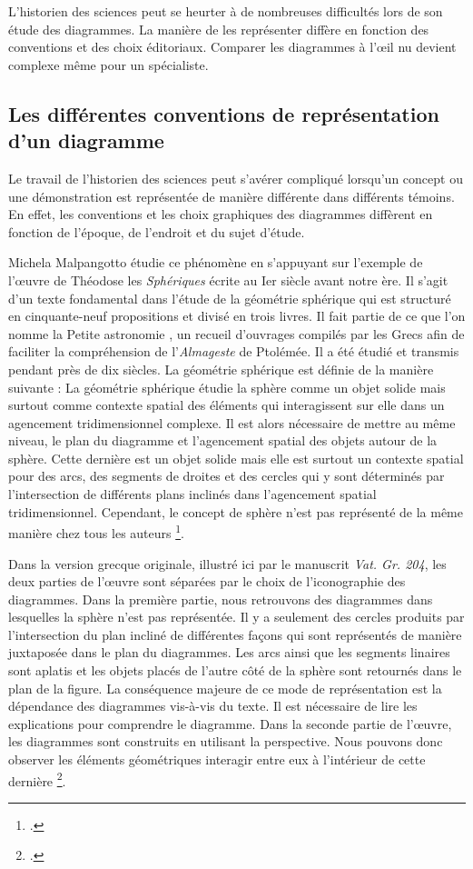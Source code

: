 L'historien des sciences peut se heurter à de nombreuses difficultés lors de son étude des diagrammes. La manière de les représenter diffère en fonction des conventions et des choix éditoriaux. Comparer les diagrammes à l'œil nu devient complexe même pour un spécialiste.

\subsection{Les différentes conventions de représentation d'un diagramme}

Le travail de l'historien des sciences peut s'avérer compliqué lorsqu'un concept ou une démonstration est représentée de manière différente dans différents témoins. En effet, les conventions et les choix graphiques des diagrammes diffèrent en fonction de l'époque, de l'endroit et du sujet d'étude.

Michela Malpangotto étudie ce phénomène en s'appuyant sur l'exemple de l'œuvre de Théodose les \textit{Sphériques} écrite au Ier siècle avant notre ère. Il s'agit d'un texte fondamental dans l'étude de la géométrie sphérique qui est structuré en cinquante-neuf propositions et divisé en trois livres. Il fait partie de ce que l'on nomme la \og Petite astronomie \fg, un recueil d'ouvrages compilés par les Grecs afin de faciliter la compréhension de l'\textit{Almageste} de Ptolémée. Il a été étudié et transmis pendant près de dix siècles. La géométrie sphérique est définie de la manière suivante : \og La géométrie sphérique étudie la sphère comme un objet solide mais surtout comme contexte spatial des éléments qui interagissent sur elle dans un agencement tridimensionnel complexe. \fg Il est alors nécessaire de mettre au même niveau, le plan du diagramme et l'agencement spatial des objets autour de la sphère. Cette dernière est un objet solide mais elle est surtout un contexte spatial pour des arcs, des segments de droites et des cercles qui y sont déterminés par l'intersection de différents plans inclinés dans l'agencement spatial tridimensionnel. Cependant, le concept de sphère n'est pas représenté de la même manière chez tous les auteurs \footcite{malpangottoGraphicalChoicesGeometrical2010}. 

Dans la version grecque originale, illustré ici par le manuscrit \textit{Vat. Gr. 204}, les deux parties de l'œuvre sont séparées par le choix de l'iconographie des diagrammes. Dans la première partie, nous retrouvons des diagrammes dans lesquelles la sphère n'est pas représentée. Il y a seulement des cercles produits par l'intersection du plan incliné de différentes façons qui sont représentés de manière juxtaposée dans le plan du diagrammes. Les arcs ainsi que les segments linaires sont aplatis et les objets placés de l'autre côté de la sphère sont retournés dans le plan de la figure. La conséquence majeure de ce mode de représentation est la dépendance des diagrammes vis-à-vis du texte. Il est nécessaire de lire les explications pour comprendre le diagramme. Dans la seconde partie de l'œuvre, les diagrammes sont construits en utilisant la perspective. Nous pouvons donc observer les éléments géométriques interagir entre eux à l'intérieur de cette dernière \footcite{malpangottoGraphicalChoicesGeometrical2010}.  

